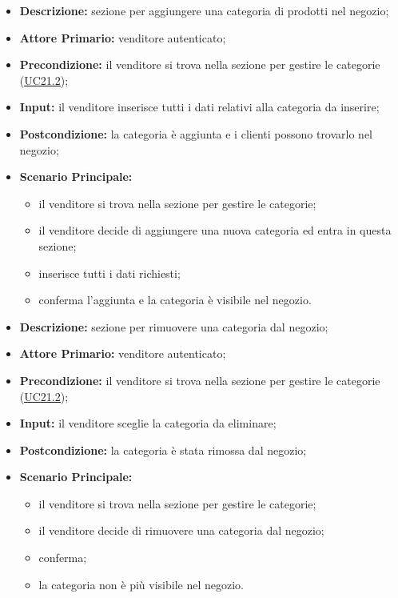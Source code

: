         \begin{itemize}
            \item \textbf{Descrizione:} sezione per aggiungere una categoria di prodotti nel negozio;
            \item \textbf{Attore Primario:} venditore autenticato;
            \item \textbf{Precondizione:} il venditore si trova nella sezione per gestire le categorie (\hyperref[sec:UC21.2]{\underline{UC21.2}});
            \item \textbf{Input:} il venditore inserisce tutti i dati relativi alla categoria da inserire;
            \item \textbf{Postcondizione:} la categoria è aggiunta e i clienti possono trovarlo nel negozio;
            \item \textbf{Scenario Principale:} 
                \begin{itemize}
                    \item il venditore si trova nella sezione per gestire le categorie;
                    \item il venditore decide di aggiungere una nuova categoria ed entra in questa sezione;
                    \item inserisce tutti i dati richiesti;
                    \item conferma l'aggiunta e la categoria è visibile nel negozio.
                \end{itemize}
        \end{itemize}
        \begin{itemize}
            \item \textbf{Descrizione:} sezione per rimuovere una categoria dal negozio;
            \item \textbf{Attore Primario:} venditore autenticato;
            \item \textbf{Precondizione:} il venditore si trova nella sezione per gestire le categorie (\hyperref[sec:UC21.2]{\underline{UC21.2}});
            \item \textbf{Input:} il venditore sceglie la categoria da eliminare;
            \item \textbf{Postcondizione:} la categoria è stata rimossa dal negozio;
            \item \textbf{Scenario Principale:} 
                \begin{itemize}
                    \item il venditore si trova nella sezione per gestire le categorie;
                    \item il venditore decide di rimuovere una categoria dal negozio;
                    \item conferma;
                    \item la categoria non è più visibile nel negozio.
                \end{itemize}
        \end{itemize}

